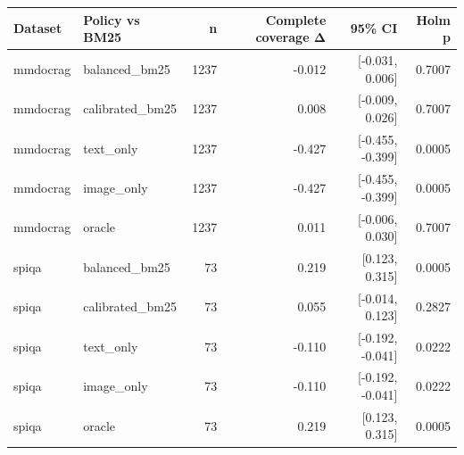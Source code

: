 \begin{tabular}{llrrrr}
\toprule
Dataset & Policy vs BM25 & n & Complete coverage Δ & 95\% CI & Holm p \\
\midrule
mmdocrag & balanced\_bm25 & 1237 & -0.012 & [-0.031, 0.006] & 0.7007 \\
mmdocrag & calibrated\_bm25 & 1237 & 0.008 & [-0.009, 0.026] & 0.7007 \\
mmdocrag & text\_only & 1237 & -0.427 & [-0.455, -0.399] & 0.0005 \\
mmdocrag & image\_only & 1237 & -0.427 & [-0.455, -0.399] & 0.0005 \\
mmdocrag & oracle & 1237 & 0.011 & [-0.006, 0.030] & 0.7007 \\
spiqa & balanced\_bm25 & 73 & 0.219 & [0.123, 0.315] & 0.0005 \\
spiqa & calibrated\_bm25 & 73 & 0.055 & [-0.014, 0.123] & 0.2827 \\
spiqa & text\_only & 73 & -0.110 & [-0.192, -0.041] & 0.0222 \\
spiqa & image\_only & 73 & -0.110 & [-0.192, -0.041] & 0.0222 \\
spiqa & oracle & 73 & 0.219 & [0.123, 0.315] & 0.0005 \\
\bottomrule
\end{tabular}
